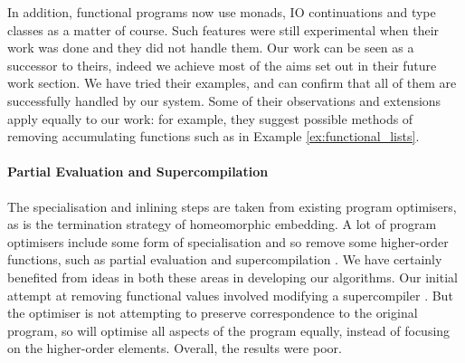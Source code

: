 In addition, functional programs now use monads, IO continuations and type classes as a matter of course. Such features were still experimental when their work was done and they did not handle them. Our work can be seen as a successor to theirs, indeed we achieve most of the aims set out in their future work section. We have tried their examples, and can confirm that all of them are successfully handled by our system. Some of their observations and extensions apply equally to our work: for example, they suggest possible methods of removing accumulating functions such as in Example \ref{ex:functional_lists}.

\paragraph{Partial Evaluation and Supercompilation}

The specialisation and inlining steps are taken from existing program optimisers, as is the termination strategy of homeomorphic embedding. A lot of program optimisers include some form of specialisation and so remove some higher-order functions, such as partial evaluation \cite{jones:partial_evaluation} and supercompilation \cite{supercompilation}. We have certainly benefited from ideas in both these areas in developing our algorithms. Our initial attempt at removing functional values involved modifying a supercompiler \cite{me:supero}. But the optimiser is not attempting to preserve correspondence to the original program, so will optimise all aspects of the program equally, instead of focusing on the higher-order elements. Overall, the results were poor.

